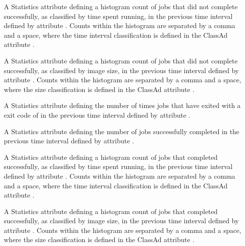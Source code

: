 \begin{description}
\item[\AdAttr{RecentJobsBadputRuntimes}:] A Statistics attribute defining
  a histogram count of jobs that did not complete successfully,
  as classified by time spent running,
  in the previous time interval defined by attribute .
  Counts within the histogram are separated by a comma and a space,
  where the time interval classification is defined in the ClassAd attribute
  .

\item[\AdAttr{RecentJobsBadputSizes}:]  A Statistics attribute defining
  a histogram count of jobs that did not complete successfully,
  as classified by image size,
  in the previous time interval defined by attribute .
  Counts within the histogram are separated by a comma and a space, 
  where the size classification is defined in the ClassAd attribute
  .

\item[\AdAttr{RecentJobsCheckpointed}:] A Statistics attribute defining
  the number of times jobs that have exited 
  with a  exit code of 
  in the previous time interval defined by attribute .

\item[\AdAttr{RecentJobsCompleted}:] A Statistics attribute defining
  the number of jobs successfully completed
  in the previous time interval defined by attribute .

\item[\AdAttr{RecentJobsCompletedRuntimes}:] A Statistics attribute defining
  a histogram count of jobs that completed successfully, 
  as classified by time spent running,
  in the previous time interval defined by attribute .
  Counts within the histogram are separated by a comma and a space,
  where the time interval classification is defined in the ClassAd attribute
  .

\item[\AdAttr{RecentJobsCompletedSizes}:] A Statistics attribute defining
  a histogram count of jobs that completed successfully,
  as classified by image size,
  in the previous time interval defined by attribute .
  Counts within the histogram are separated by a comma and a space, 
  where the size classification is defined in the ClassAd attribute
  .


\end{description}
